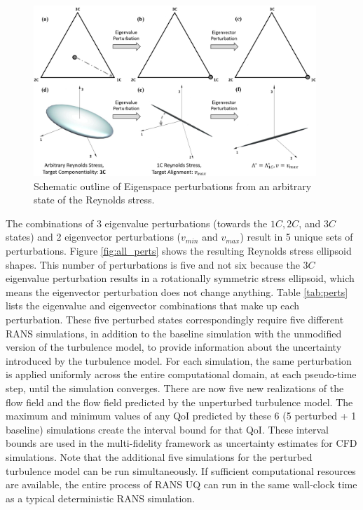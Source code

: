 \begin{figure}
    \center
    \includegraphics[width=0.95\textwidth]{suthesis/images/eig_pert_1c.png}
    \caption{Schematic outline of Eigenspace perturbations from an arbitrary state of the Reynolds stress. \label{fig:pert_vis}}
\end{figure}

The combinations of 3 eigenvalue perturbations (towards the $1C, 2C$, and $3C$ states) and 2 eigenvector perturbations ($v_{min}$ and $v_{max}$) result in 5 unique sets of perturbations.
Figure \ref{fig:all_perts} shows the resulting Reynolds stress ellipsoid shapes.
This number of perturbations is five and not six because the $3C$ eigenvalue perturbation results in a rotationally symmetric stress ellipsoid, which means the eigenvector perturbation does not change anything.
Table \ref{tab:perts} lists the eigenvalue and eigenvector combinations that make up each perturbation.
These five perturbed states correspondingly require five different RANS simulations, in addition to the baseline simulation with the unmodified version of the turbulence model, to provide information about the uncertainty introduced by the turbulence model.
For each simulation, the same perturbation is applied uniformly across the entire computational domain, at each pseudo-time step, until the simulation converges.
There are now five new realizations of the flow field and the flow field predicted by the unperturbed turbulence model.
The maximum and minimum values of any QoI predicted by these 6 (5 perturbed + 1 baseline) simulations create the interval bound for that QoI.
These interval bounds are used in the multi-fidelity framework as uncertainty estimates for CFD simulations.
Note that the additional five simulations for the perturbed turbulence model can be run simultaneously.
If sufficient computational resources are available, the entire process of RANS UQ can run in the same wall-clock time as a typical deterministic RANS simulation.

